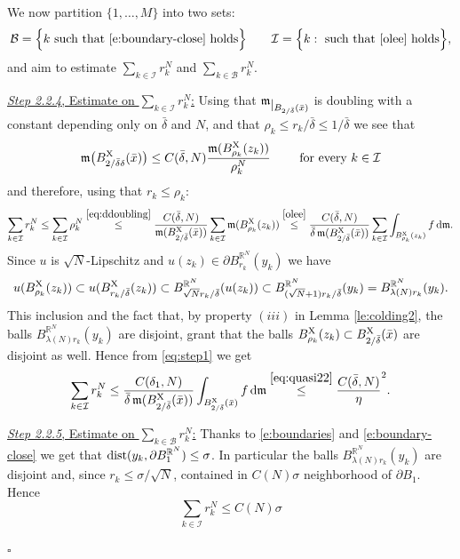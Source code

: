 \documentclass[reqno,11pt]{article}
\numberwithin{equation}{section}
\newcommand{\R}{\mathbb{R}}
\newcommand{\mm}{{\mbox{\boldmath$m$}}}
\renewcommand{\d}{{\mathrm d}}
\newcommand{\restr}[1]{\lower3pt\hbox{$|_{#1}$}}
\renewcommand{\mm}{\mathfrak m}                                %
\renewenvironment{proof}{\removelastskip\par\medskip   %
\noindent{\em Proof} \rm}{\penalty-20\null\hfill$\square$\par\medbreak}
\newcommand{\X}{{\rm X}}
\newcommand{\dist}{{\rm dist}}
\begin{document}
\begin{proof}
{We now partition  \(\{1,\dots, M\}\) into two sets: 
\[
\mathcal B=\Big\{k\text{ such that \eqref{e:boundary-close} holds}\Big\}\qquad \mathcal I=\Big\{k:\text{ such that \eqref{olee} holds}\Big\},
\]
and aim to estimate  \(\sum_{k\in \mathcal I} r_{k}^{N}\) and  \(\sum_{k\in \mathcal B} r_{k}^{N}\).
}

{\underline{\emph{Step 2.2.4}, Estimate on  \(\sum_{k\in \mathcal I} r_{k}^{N}\):}  Using  that $\mm\restr{B_{2/\bar \delta}(\bar x)}$ is doubling with a constant depending only on $\bar \delta$ and $N$, and that $\rho_k\leq r_k/\bar\delta\leq 1/\bar\delta$ we see that
\begin{equation}
\label{eq:ddoubling}
\mm\big(B^\X_{2/\bar \delta \delta}(\bar x)\big)\leq C(\bar \delta,N)\frac{\mm(B^\X_{\rho_k}(z_k))}{\rho_k^N}\qquad\text{ for every }k\in \mathcal I
\end{equation}
and therefore, using that \(r_{k}\le \rho_{k}\):
\begin{equation}
\label{eq:step1}
\sum_{k\in \mathcal I} r_{k}^{N}\le  \sum_{k\in \mathcal I}\rho_k^N\stackrel{\eqref{eq:ddoubling}}\le \frac{C(\bar \delta,N)}{\mm(B^\X_{2/\bar \delta}(\bar x))} \sum_{k\in \mathcal I}\mm(B_{\rho_k}^\X (z_k))\stackrel{\eqref{olee}}\le  \frac{C(\bar\delta,N)}{\bar\delta\,\mm(B^\X_{2/\bar \delta}(\bar x))} \sum _{k\in \mathcal I} \int_{B^\X_{\rho_k} (z_k)} f\,\d\mm.
\end{equation}
Since \(u\) is \(\sqrt{N}\)-Lipschitz and  \(u(z_k)\in \partial B^{\R^N}_{r_k}(y_k)\) we have
\[
u(B^\X_{\rho_k}(z_k))\subset u(B^\X_{r_k/\bar\delta}(z_k))\subset B^{\R^N}_{\sqrt{N}r_k/\bar\delta}(u(z_k))\subset B^{\R^N}_{(\sqrt{N}+1)r_k/\bar\delta}(y_k)=B^{\R^N}_{\lambda(N) r_k}(y_k).
\]
This inclusion and the fact that, by property $(iii)$ in Lemma \ref{le:colding2}, the balls \(B^{\R^N}_{\lambda(N) r_k}(y_k)\)  are disjoint, grant that  the balls \(B^\X_{\rho_k}(z_k)\subset B^\X_{2/\bar \delta}(\bar x) \) are disjoint as well.  Hence from \eqref{eq:step1} we get
\begin{equation}
\label{e:B}
\sum_{k\in \mathcal I} r_k^N\leq \frac{C(\delta_1,N)}{\bar\delta\,\mm(B^\X_{2/\bar \delta}(\bar x))}   \int_{B^\X_{2/\bar \delta} (\bar x)} f\,\d\mm\stackrel{\eqref{eq:quasi22}}\leq \frac{C(\bar \delta,N)}\eta^2.
\end{equation}
}

{\underline{\emph{Step 2.2.5}, Estimate on  \(\sum_{k\in \mathcal B} r_{k}^{N}\):} Thanks to \eqref{e:boundaries} and \eqref{e:boundary-close} we get that \(\dist(y_{k} , \partial B_{1}^{\R^{N}})\le \sigma\). In particular the balls \(B^{\R^N}_{\lambda(N) r_k}(y_k)\) are disjoint and, since \(r_{k}\le \sigma/\sqrt{N}\),  contained in \(C(N)\sigma\) neighborhood of \(\partial B_{1}\). Hence 
\begin{equation}
\label{e:I}
\sum_{k\in \mathcal I} r_k^N \le C(N)\sigma 
\end{equation}
}


\end{proof}
\end{document}
